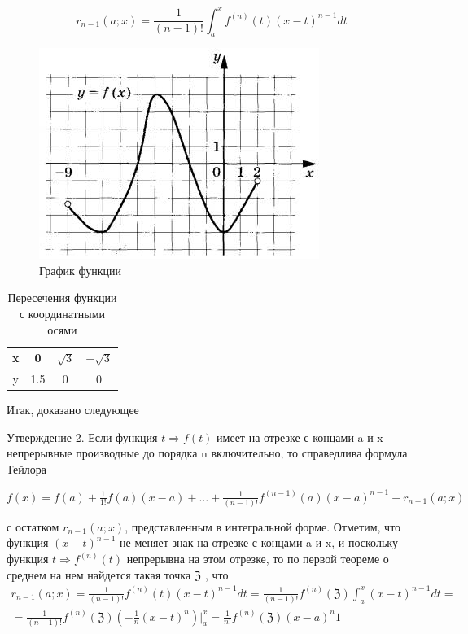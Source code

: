 \begin{equation}
	r_{n-1}(a;x)=\frac{1}{(n-1)!}\int^x_a f^{(n)}(t)(x-t)^{n-1}dt	
\end{equation}
\begin{figure}[h]   
    \centering
    \includegraphics[width=0.7\linewidth]{img1.jpg}
    \caption{ График функции }
    \label{fig:prototype}
\end{figure}

\begin{table}[H]
	\caption{Пересечения функции с координатными осями}
	\begin{center}
		\begin{tabular}{|c|c|c|c|}
			\hline
			x & 0 & $\sqrt{3}$ & $-\sqrt{3}$ \\ \hline
			y & 1.5 & 0 & 0 \\ \hline
		\end{tabular}
		\label{tabular:tab1}
	\end{center}
\end{table}


Итак, доказано следующее

Утверждение 2. Если функция $t \Rightarrow  f (t)$ имеет на отрезке с концами a
и x непрерывные производные до порядка n включительно, то справедлива
формула Тейлора

\begin{center}
	$
	f(x)=f(a)+\frac{1}{1!}f(a)(x-a)+\dots+\frac{1}{(n-1)!}f^{(n-1)}(a)(x-a)^{n-1}+r_{n-1}(a;x)
	$
\end{center}



с остатком $r_{n-1}(a; x)$, представленным в интегральной форме.
Отметим, что функция $(x - t)^{n-1}$ не меняет знак на отрезке с концами a и
x, и поскольку функция $t\Rightarrow  f ^{(n)}(t)$ непрерывна на этом отрезке, то по первой
теореме о среднем на нем найдется такая точка $\mathfrak{Z}$ , что
\begin{multline}
	r_{n-1}(a;x)=\frac{1}{(n-1)!} f^{(n)}(t)(x-t)^{n-1}dt = \frac{1}{(n-1)!} f^(n)(\mathfrak{Z}) \int^x_a (x-t)^{n-1}dt=\\
	=\frac{1}{(n-1)!} f^{(n)}(\mathfrak{Z})(-\frac{1}{n}(x-t)^n)|^x_a=\frac{1}{n!}f^{(n)}(\mathfrak{Z})(x-a)^n
	1
\end{multline}


